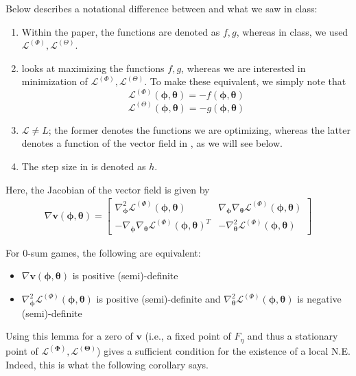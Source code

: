\documentclass{article}
\renewcommand{\vec}[1]{\ensuremath{\boldsymbol{#1}}}
\newcommand{\ltheta}[0]{\ensuremath{\mathcal{L}^{(\boldsymbol{\Theta})}}}
\newcommand{\lphi}[0]{\ensuremath{\mathcal{L}^{(\boldsymbol{\Phi})}}}
\newcommand{\phth}[0]{\ensuremath{(\boldsymbol{\phi}, \boldsymbol{\theta})}}
\begin{document}
Below describes a notational difference between \citet{MeschederNG17a} and what we saw in class:
\begin{enumerate}
    \item Within the paper, the functions are denoted as $f, g$, whereas in class, we used $\mathcal{L}^{(\Phi)}, \mathcal{L}^{(\Theta)}$. 
    \item \citet{MeschederNG17a} looks at maximizing the functions $f, g$, whereas we are interested in minimization of $\mathcal{L}^{(\Phi)}, \mathcal{L}^{(\Theta)}$. To make these equivalent, we simply note that $$\mathcal{L}^{(\Phi)}(\vec{\phi}, \vec{\theta}) = -f(\vec{\phi}, \vec{\theta})$$
    $$\mathcal{L}^{(\Theta)}(\vec{\phi}, \vec{\theta}) = -g(\vec{\phi}, \vec{\theta})$$
    \item $\mathcal{L} \neq L$; the former denotes the functions we are optimizing, whereas the latter denotes a function of the vector field in \citet{MeschederNG17a}, as we will see below.
    \item The step size in \citet{MeschederNG17a} is denoted as $h$. 
\end{enumerate}
Here, the Jacobian of the vector field is given by
\begin{align}
    \nabla\vec{v}\phth= 
    \begin{bmatrix} 
        \nabla^2_{\vec{\phi}} \mathcal{L}^{(\Phi)}(\vec{\phi}, \vec{\theta}) & \nabla_{\vec{\phi}}\nabla_{\vec{\theta}} \mathcal{L}^{(\Phi)}(\vec{\phi}, \vec{\theta}) \\
        - \nabla_{\vec{\phi}}\nabla_{\vec{\theta}} \mathcal{L}^{(\Phi)}(\vec{\phi}, \vec{\theta})^T & - \nabla^2_{\vec{\theta}} \mathcal{L}^{(\Phi)}(\vec{\phi}, \vec{\theta}) 
    \end{bmatrix}
\end{align} 

\begin{lem}
    For $0$-sum games, the following are equivalent:
    \begin{itemize}
        \item $\nabla\vec{v}(\vec{\phi},\vec{\theta})$ is positive (semi)-definite
        \item $\nabla^2_{\vec{\phi}} \mathcal{L}^{(\Phi)}(\vec{\phi}, \vec{\theta})$ is positive (semi)-definite and $\nabla^2_{\vec{\theta}} \mathcal{L}^{(\Phi)}(\vec{\phi}, \vec{\theta})$ is negative (semi)-definite
    \end{itemize}
\end{lem}

Using this lemma for a zero of $\vec{v}$ (i.e., a fixed point of $F_\eta$ and thus a stationary point of $\lphi, \ltheta$) gives a sufficient condition for the existence of a local N.E. Indeed, this is what the following corollary says.
\end{document}

